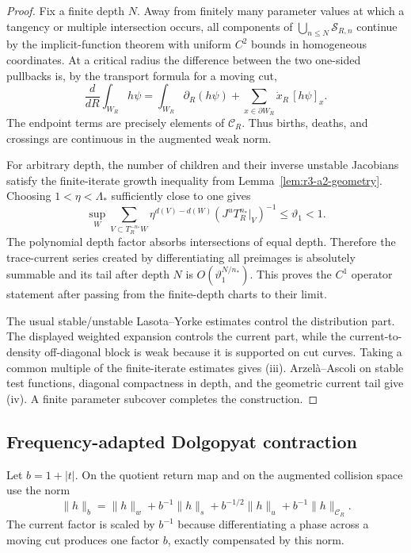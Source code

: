 \begin{proof}
Fix a finite depth \(N\).  Away from finitely many parameter values at which a
tangency or multiple intersection occurs, all components of
\(\bigcup_{n\le N}\mathscr S_{R,n}\) continue by the implicit-function
theorem with uniform \(C^2\) bounds in homogeneous coordinates.  At a critical
radius the difference between the two one-sided pullbacks is, by the transport
formula for a moving cut,
\[
 \frac d{dR}\int_{W_R}h\psi
 =\int_{W_R}\partial_R(h\psi)
  +\sum_{x\in\partial W_R}
  \dot x_R\,[h\psi]_x .
\]
The endpoint terms are precisely elements of \(\mathcal C_R\).  Thus births,
deaths, and crossings are continuous in the augmented weak norm.

For arbitrary depth, the number of children and their inverse unstable
Jacobians satisfy the finite-iterate growth inequality from
Lemma~\ref{lem:r3-a2-geometry}.  Choosing
\(1<\eta<\Lambda_*\) sufficiently close to one gives
\[
 \sup_W\sum_{V\subset T_R^{-n_*}W}
 \eta^{d(V)-d(W)}(J^uT_R^{n_*}|_V)^{-1}
 \le\vartheta_1<1.
\]
The polynomial depth factor absorbs intersections of equal depth.  Therefore
the trace-current series created by differentiating all preimages is
absolutely summable and its tail after depth \(N\) is \(O(\vartheta_1^{N/n_*})\).
This proves the \(C^1\) operator statement after passing from the finite-depth
charts to their limit.

The usual stable/unstable Lasota--Yorke estimates control the distribution
part.  The displayed weighted expansion controls the current part, while the
current-to-density off-diagonal block is weak because it is supported on cut
curves.  Taking a common multiple of the finite-iterate estimates gives (iii).
Arzel\`a--Ascoli on stable test functions, diagonal compactness in depth, and
the geometric current tail give (iv).  A finite parameter subcover completes
the construction.
\end{proof}

\subsection{Frequency-adapted Dolgopyat contraction}

Let \(b=1+|t|\).  On the quotient return map and on the augmented collision
space use the norm
\[
 \|h\|_{b}
 =\|h\|_{w}+b^{-1}\|h\|_{s}
   +b^{-1/2}\|h\|_{u}
   +b^{-1}\|h\|_{\mathcal C_R}.
\]
The current factor is scaled by \(b^{-1}\) because differentiating a phase
across a moving cut produces one factor \(b\), exactly compensated by this
norm.

